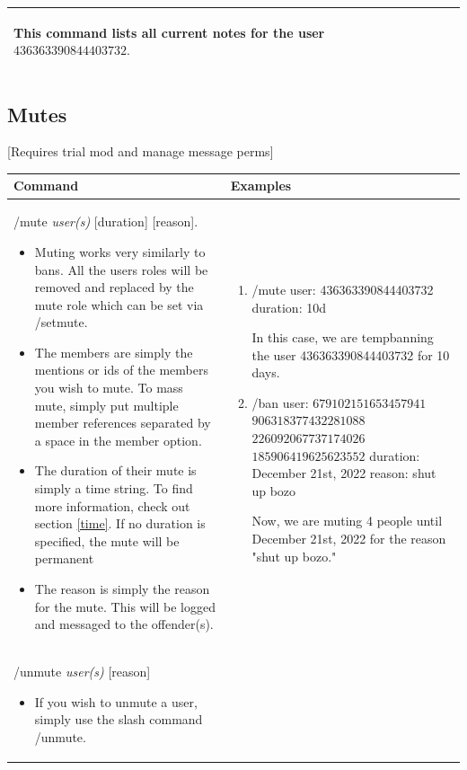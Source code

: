\documentclass{scrartcl}
\begin{document}
\begin{tabularx}{\textwidth}{|>{\raggedright\arraybackslash}X|>{\raggedright\arraybackslash}X|}
\begin{enumerate}
    This command lists all current notes for the user $436363390844403732.$
\end{enumerate}\\
\hline
\end{tabularx}
\newpage

\subsection{Mutes} [Requires trial mod and manage message perms]
\begin{tabularx}{\textwidth}{|>{\raggedright\arraybackslash}X|>{\raggedright\arraybackslash}X|}
\hline 
Command & Examples\\
\hline
/mute \textit{user(s)} [duration] [reason].

\begin{itemize}
    \item Muting works very similarly to bans. All the users roles will be removed and replaced by the mute role which can be set via /setmute.
    
    \item The members are simply the mentions or ids of the members you wish to mute. To mass mute, simply put multiple member references separated by a space in the member option. 

    \item The duration of their mute is simply a time string. To find more information, check out section \ref{time}. If no duration is specified, the mute will be permanent

    \item The reason is simply the reason for the mute. This will be logged and messaged to the offender(s). 
\end{itemize}
& \begin{enumerate}
    \item 
    /mute \color{black} user: \color{gray}436363390844403732 \color{black} 
    duration: \color{gray}10d \color{black}
    
    In this case, we are tempbanning the user 436363390844403732 for 10 days.
    \item
    /ban \color{black} user: \color{gray}$679102151653457941$ $906318377432281088$ $226092067737174026$ $185906419625623552$ \color{black}duration: \color{gray}December 21st, 2022 \color{black} reason: \color{gray} shut up bozo\color{black}
    
    Now, we are muting 4 people until December 21st, 2022 for the reason "shut up bozo."
\end{enumerate}\\
\hline
/unmute \textit{user(s)} [reason]
\begin{itemize}
    \item If you wish to unmute a user, simply use the slash command /unmute.


\end{itemize}
\end{tabularx}
\end{document}
